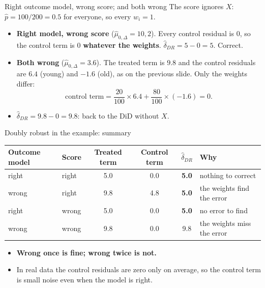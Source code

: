 \documentclass[
  11pt,
  ignorenonframetext,
  aspectratio=169,
]{beamer}
\providecommand{\tightlist}{%
  \setlength{\itemsep}{0pt}\setlength{\parskip}{0pt}}
\begin{document}
\begin{frame}{Right outcome model, wrong score; and both wrong}
\protect{}\label{right-outcome-model-wrong-score-and-both-wrong}
The score ignores \(X\): \(\hat p = 100/200 = 0.5\) for everyone, so
every \(w_i = 1\).

\begin{itemize}
\tightlist
\item
  \textbf{Right model, wrong score} (\(\hat\mu_{0,\Delta} = 10, 2\)).
  Every control residual is \(0\), so the control term is \(0\)
  \textbf{whatever the weights}. \(\hat\delta_{DR} = 5 - 0 = 5\).
  Correct.
\item
  \textbf{Both wrong} (\(\hat\mu_{0,\Delta} = 3.6\)). The treated term
  is \(9.8\) and the control residuals are \(6.4\) (young) and \(-1.6\)
  (old), as on the previous slide. Only the weights differ: \[
  \text{control term} = \frac{20}{100} \times 6.4 + \frac{80}{100} \times (-1.6) = 0 .
  \]
\item
  \(\hat\delta_{DR} = 9.8 - 0 = 9.8\): back to the DiD without \(X\).
\end{itemize}
\end{frame}

\begin{frame}{Doubly robust in the example: summary}
\protect{}\label{doubly-robust-in-the-example-summary}
\begin{center}\small
\begin{tabular}{llcccl}
\toprule
Outcome model & Score & Treated term & Control term & $\hat\delta_{DR}$ & Why \\
\midrule
right & right & 5.0 & 0.0 & \textbf{5.0} & nothing to correct \\
wrong & right & 9.8 & 4.8 & \textbf{5.0} & the weights find the error \\
right & wrong & 5.0 & 0.0 & \textbf{5.0} & no error to find \\
wrong & wrong & 9.8 & 0.0 & 9.8 & the weights miss the error \\
\bottomrule
\end{tabular}
\end{center}

\begin{itemize}
\tightlist
\item
  \textbf{Wrong once is fine; wrong twice is not.}
\item
  In real data the control residuals are zero only on average, so the
  control term is small noise even when the model is right.
\end{itemize}
\end{frame}
\end{document}
